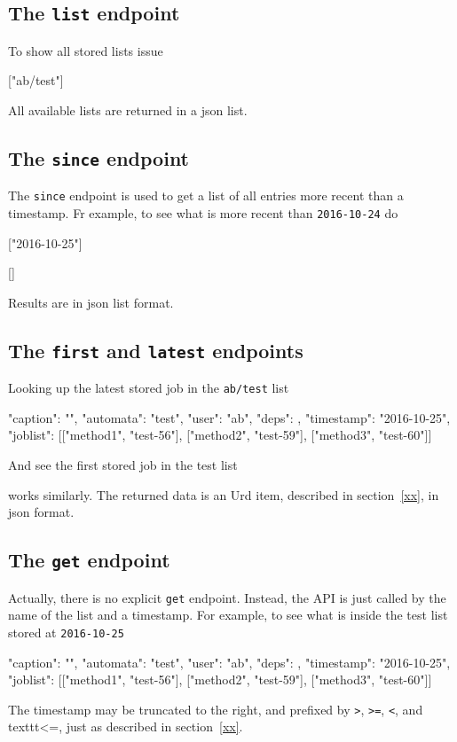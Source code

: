 \subsection{The \texttt{list} endpoint}
To show all stored lists issue
\begin{shell}
["ab/test"]
\end{shell}
All available lists are returned in a json list.


\subsection{The \texttt{since} endpoint}
The \texttt{since} endpoint is used to get a list of all entries more recent than a timestamp.
Fr example, to see what is more recent than \texttt{2016-10-24} do
\begin{shell}
["2016-10-25"]
\end{shell}
\begin{shell}
[]
\end{shell}
Results are in json list format.


\subsection{The \texttt{first} and \texttt{latest} endpoints}
Looking up the latest stored job in the \texttt{ab/test} list
\begin{shell}
{"caption": "", "automata": "test", "user": "ab", "deps": {},
  "timestamp": "2016-10-25", "joblist": [["method1", "test-56"],
  ["method2", "test-59"], ["method3", "test-60"]]}
\end{shell}
And see the first stored job in the test list
\begin{shell}
\end{shell}
works similarly.  The returned data is an Urd item, described in
section~\ref{xx}, in json format.



\subsection{The \texttt{get} endpoint}
Actually, there is no explicit \texttt{get} endpoint.  Instead, the
API is just called by the name of the list and a timestamp.  For
example, to see what is inside the test list stored
at \texttt{2016-10-25}
\begin{shell}
{"caption": "", "automata": "test", "user": "ab", "deps": {},
  "timestamp": "2016-10-25", "joblist": [["method1", "test-56"],
  ["method2", "test-59"], ["method3", "test-60"]]}
\end{shell}
The timestamp may be truncated to the right, and prefixed
by \texttt{>}, \texttt{>=}, \texttt{<}, and texttt{<=}, just as
described in section~\ref{xx}.


